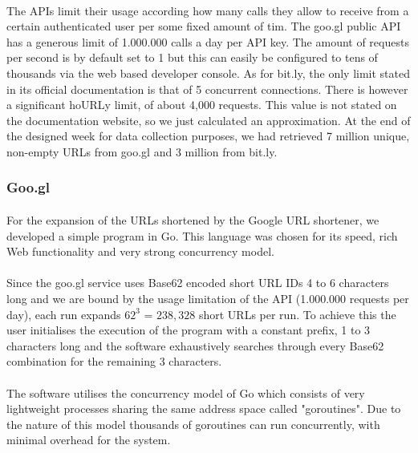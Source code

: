 \documentclass[12pt]{article}
\begin{document}
\paragraph{}
The APIs limit their usage according how many calls they allow to receive from a certain authenticated user per some fixed amount of tim. The goo.gl public API has a generous limit of 1.000.000 calls a day per API key. The amount of requests per second is by default set to 1 but this can easily be configured to tens of thousands via the web based developer console. As for bit.ly, the only limit stated in its official documentation is that of 5 concurrent connections. There is however a significant hoURLy limit, of  about 4,000 requests. This value is not stated on the documentation website, so we just calculated an approximation. At the end of the designed week for data collection purposes, we had retrieved 7 million unique, non-empty URLs from goo.gl and 3 million from bit.ly.

\subsubsection{Goo.gl}
\paragraph{}
For the expansion of the URLs shortened by the Google URL shortener, we developed a simple program in Go. This language was chosen for its speed, rich Web functionality and very strong concurrency model. 

\paragraph{}
Since the goo.gl service uses Base62 encoded short URL IDs 4 to 6 characters long and we are bound by the usage limitation of the API (1.000.000 requests per day), each run expands $62^{3}$ = $238,328$ short URLs per run. To achieve this the user initialises the execution of the program with a constant prefix, 1 to 3 characters long and the software exhaustively searches through every Base62 combination for the remaining 3 characters.

\paragraph{}
The software utilises the concurrency model of Go which consists of very lightweight processes sharing the same address space called "goroutines". Due to the nature of this model thousands of goroutines can run concurrently, with minimal overhead for the system. 
\end{document}
